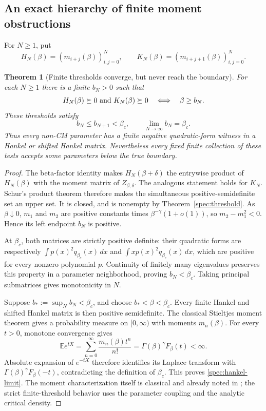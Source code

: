 \documentclass[11pt,a4paper]{article}
\newtheorem{theorem}{Theorem}[section]
\theoremstyle{definition}
\theoremstyle{remark}
\numberwithin{equation}{section}
\begin{document}
\subsection{An exact hierarchy of finite moment obstructions}

For \(N\ge1\), put
\[
 H_N(\beta)=(m_{i+j}(\beta))_{i,j=0}^N,
 \qquad K_N(\beta)=(m_{i+j+1}(\beta))_{i,j=0}^N.
\]

\begin{theorem}[Finite thresholds converge, but never reach the boundary]
\label{spec:hankel}
For each \(N\ge1\) there is a finite \(b_N>0\) such that
\[
 H_N(\beta)\succeq0\ \hbox{and}\ K_N(\beta)\succeq0
       \quad\Longleftrightarrow\quad \beta\ge b_N.
\]
These thresholds satisfy
\begin{equation}\label{spec:hankel-limit}
 b_N\le b_{N+1}<\beta_c,
 \qquad \lim_{N\to\infty}b_N=\beta_c.
\end{equation}
Thus every non-CM parameter has a finite negative quadratic-form
witness in a Hankel or shifted Hankel matrix.  Nevertheless every
fixed finite collection of these tests accepts some parameters below
the true boundary.
\end{theorem}

\begin{proof}
The beta-factor identity makes \(H_N(\beta+\delta)\) the entrywise
product of \(H_N(\beta)\) with the moment matrix of \(Z_{\beta,\delta}\).
The analogous statement holds for \(K_N\).  Schur's product theorem
therefore makes the simultaneous positive-semidefinite set an upper
set.  It is closed, and is nonempty by Theorem~\ref{spec:threshold}.
As \(\beta\downarrow0\), \(m_1\) and \(m_2\) are positive constants
times \(\beta^{-\gamma}(1+o(1))\), so
\(m_2-m_1^2<0\).  Hence its left endpoint \(b_N\) is positive.

At \(\beta_c\), both matrices are strictly positive definite:
their quadratic forms are respectively
\(\int p(x)^2q_{\beta_c}(x)\,dx\) and
\(\int xp(x)^2q_{\beta_c}(x)\,dx\), which are positive for every
nonzero polynomial \(p\).  Continuity of finitely many eigenvalues
preserves this property in a parameter neighborhood, proving
\(b_N<\beta_c\).  Taking principal submatrices gives monotonicity in
\(N\).

Suppose \(b_*:=\sup_N b_N<\beta_c\), and choose
\(b_*<\beta<\beta_c\).  Every finite Hankel and shifted Hankel
matrix is then positive semidefinite.  The classical Stieltjes moment
theorem gives a probability measure on \([0,\infty)\) with moments
\(m_n(\beta)\).  For every \(t>0\), monotone convergence gives
\[
 \mathbb E e^{tX}
   =\sum_{n=0}^\infty\frac{m_n(\beta)t^n}{n!}
   =\Gamma(\beta)^\gamma F_\beta(t)<\infty.
\]
Absolute expansion of \(e^{-tX}\) therefore identifies its Laplace
transform with \(\Gamma(\beta)^\gamma F_\beta(-t)\), contradicting
the definition of \(\beta_c\).  This proves \eqref{spec:hankel-limit}.
The moment characterization itself is classical and already noted
in \cite[Section~3]{Simon2021}; the strict finite-threshold behavior
uses the parameter coupling and the analytic critical density.
\end{proof}
\end{document}
